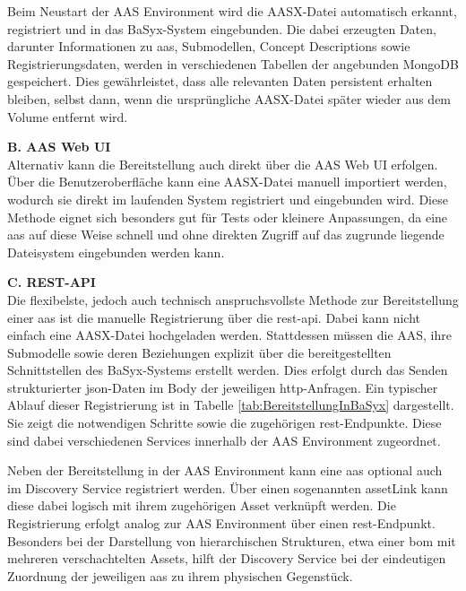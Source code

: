Beim Neustart der AAS Environment wird die AASX-Datei automatisch erkannt, registriert und in das BaSyx-System eingebunden.
Die dabei erzeugten Daten, darunter Informationen zu \acs{aas}, Submodellen, Concept Descriptions sowie Registrierungsdaten, werden in verschiedenen Tabellen der angebunden MongoDB gespeichert.
Dies gewährleistet, dass alle relevanten Daten persistent erhalten bleiben, selbst dann, wenn die ursprüngliche AASX-Datei später wieder aus dem Volume entfernt wird.

\vspace{0.5em}
\noindent\textbf{B. AAS Web UI}\\
Alternativ kann die Bereitstellung auch direkt über die AAS Web UI erfolgen.
Über die Benutzeroberfläche kann eine AASX-Datei manuell importiert werden, wodurch sie direkt im laufenden System registriert und eingebunden wird.
Diese Methode eignet sich besonders gut für Tests oder kleinere Anpassungen, da eine \acs{aas} auf diese Weise schnell und ohne direkten Zugriff auf das zugrunde liegende Dateisystem eingebunden werden kann.

\vspace{0.5em}
\noindent\textbf{C. REST-API}\\
Die flexibelste, jedoch auch technisch anspruchsvollste Methode zur Bereitstellung einer \acs{aas} ist die manuelle Registrierung über die \acs{rest}-\acs{api}. 
Dabei kann nicht einfach eine AASX-Datei hochgeladen werden. 
Stattdessen müssen die AAS, ihre Submodelle sowie deren Beziehungen explizit über die bereitgestellten Schnittstellen des BaSyx-Systems erstellt werden. 
Dies erfolgt durch das Senden strukturierter \acs{json}-Daten im Body der jeweiligen \acs{http}-Anfragen.
Ein typischer Ablauf dieser Registrierung ist in Tabelle \ref{tab:BereitstellungInBaSyx} dargestellt. 
Sie zeigt die notwendigen Schritte sowie die zugehörigen \acs{rest}-Endpunkte.
Diese sind dabei verschiedenen Services innerhalb der AAS Environment zugeordnet.

\newpage


Neben der Bereitstellung in der AAS Environment kann eine \acs{aas} optional auch im Discovery Service registriert werden.
Über einen sogenannten assetLink kann diese dabei logisch mit ihrem zugehörigen Asset verknüpft werden.
Die Registrierung erfolgt analog zur AAS Environment über einen \acs{rest}-Endpunkt.
Besonders bei der Darstellung von hierarchischen Strukturen, etwa einer \acs{bom} mit mehreren verschachtelten Assets, hilft der Discovery Service bei der eindeutigen Zuordnung der jeweiligen \acs{aas} zu ihrem physischen Gegenstück.


